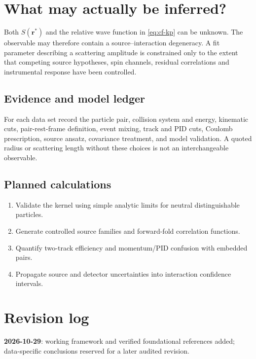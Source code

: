 \section{What may actually be inferred?}\label{sec:cf-inference}
Both $S(\bm r^*)$ and the relative wave function in \cref{eq:cf-kp} can be unknown. The observable may therefore contain a source--interaction degeneracy. A fit parameter describing a scattering amplitude is constrained only to the extent that competing source hypotheses, spin channels, residual correlations and instrumental response have been controlled.

\subsection{Evidence and model ledger}
For each data set record the particle pair, collision system and energy, kinematic cuts, pair-rest-frame definition, event mixing, track and PID cuts, Coulomb prescription, source ansatz, covariance treatment, and model validation. A quoted radius or scattering length without these choices is not an interchangeable observable.

\subsection{Planned calculations}
\begin{enumerate}
\item Validate the kernel using simple analytic limits for neutral distinguishable particles.
\item Generate controlled source families and forward-fold correlation functions.
\item Quantify two-track efficiency and momentum/PID confusion with embedded pairs.
\item Propagate source and detector uncertainties into interaction confidence intervals.
\end{enumerate}

\section*{Revision log}
\textbf{2026-10-29}: working framework and verified foundational references added; data-specific conclusions reserved for a later audited revision.
